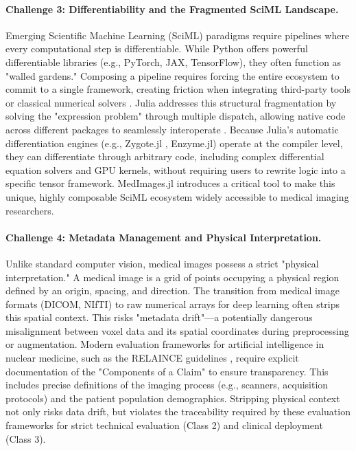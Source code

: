\documentclass[10pt,letterpaper]{article}
\begin{document}
\paragraph{Challenge 3: Differentiability and the Fragmented SciML Landscape.}
Emerging Scientific Machine Learning (SciML) paradigms require pipelines where every computational step is differentiable. While Python offers powerful differentiable libraries (e.g., PyTorch, JAX, TensorFlow), they often function as "walled gardens." Composing a pipeline requires forcing the entire ecosystem to commit to a single framework, creating friction when integrating third-party tools or classical numerical solvers \cite{PalBhattacharya2024, EschleGl2023}. Julia addresses this structural fragmentation by solving the "expression problem" through multiple dispatch, allowing native code across different packages to seamlessly interoperate \cite{RoeschGreener2023}. Because Julia's automatic differentiation engines (e.g., Zygote.jl \cite{Fischer_2019}, Enzyme.jl) operate at the compiler level, they can differentiate through arbitrary code, including complex differential equation solvers and GPU kernels, without requiring users to rewrite logic into a specific tensor framework. MedImages.jl introduces a critical tool to make this unique, highly composable SciML ecosystem widely accessible to medical imaging researchers.

\paragraph{Challenge 4: Metadata Management and Physical Interpretation.}
Unlike standard computer vision, medical images possess a strict "physical interpretation." A medical image is a grid of points occupying a physical region defined by an origin, spacing, and direction. The transition from medical image formats (DICOM, NIfTI) to raw numerical arrays for deep learning often strips this spatial context. This risks "metadata drift"---a potentially dangerous misalignment between voxel data and its spatial coordinates during preprocessing or augmentation. Modern evaluation frameworks for artificial intelligence in nuclear medicine, such as the RELAINCE guidelines \cite{JhaBradshaw2022}, require explicit documentation of the "Components of a Claim" to ensure transparency. This includes precise definitions of the imaging process (e.g., scanners, acquisition protocols) and the patient population demographics. Stripping physical context not only risks data drift, but violates the traceability required by these evaluation frameworks for strict technical evaluation (Class 2) and clinical deployment (Class 3).
\end{document}
